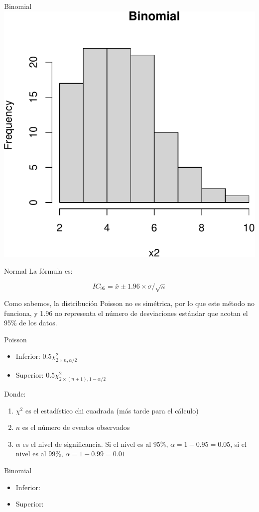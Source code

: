 \documentclass[
  11pt,
  ignorenonframetext,
]{beamer}
\providecommand{\tightlist}{%
  \setlength{\itemsep}{0pt}\setlength{\parskip}{0pt}}
\begin{document}
\begin{frame}{Binomial}
\protect\hypertarget{binomial}{}
\includegraphics{Intervalos-poisson_files/figure-beamer/unnamed-chunk-3-1.pdf}
\end{frame}

\begin{frame}{Normal}
\protect\hypertarget{normal-1}{}
La fórmula es:

\[IC_{95} = \bar{x} \pm 1.96 \times \sigma/\sqrt{n}\]

Como sabemos, la distribución Poisson no es simétrica, por lo que este
método no funciona, y 1.96 no representa el número de desviaciones
estándar que acotan el 95\% de los datos.
\end{frame}

\begin{frame}{Poisson}
\protect\hypertarget{poisson-1}{}
\begin{itemize}
\item
  Inferior: \(0.5 \chi^2_{2 \times n, \alpha/2}\)
\item
  Superior: \(0.5 \chi^2_{2 \times (n+1), 1-\alpha/2}\)
\end{itemize}

Donde:

\begin{enumerate}
\tightlist
\item
  \(\chi^2\) es el estadístico chi cuadrada (más tarde para el cálculo)
\item
  \(n\) es el número de eventos observados
\item
  \(\alpha\) es el nivel de significancia. Si el nivel es al 95\%,
  \(\alpha = 1-0.95 = 0.05\), si el nivel es al 99\%,
  \(\alpha = 1-0.99 = 0.01\)
\end{enumerate}
\end{frame}

\begin{frame}{Binomial}
\protect\hypertarget{binomial-1}{}
\begin{itemize}
\item
  Inferior:
\item
  Superior:
\end{itemize}
\end{frame}
\end{document}
